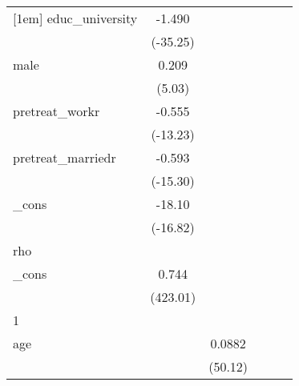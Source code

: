 {\begin{tabular}{l*{5}{c}}
[1em]
educ\_university&      -1.490\sym{***}&                     &                     &                     &                     \\
            &    (-35.25)         &                     &                     &                     &                     \\
[1em]
male        &       0.209\sym{***}&                     &                     &                     &                     \\
            &      (5.03)         &                     &                     &                     &                     \\
[1em]
pretreat\_workr&      -0.555\sym{***}&                     &                     &                     &                     \\
            &    (-13.23)         &                     &                     &                     &                     \\
[1em]
pretreat\_marriedr&      -0.593\sym{***}&                     &                     &                     &                     \\
            &    (-15.30)         &                     &                     &                     &                     \\
[1em]
\_cons      &      -18.10\sym{***}&                     &                     &                     &                     \\
            &    (-16.82)         &                     &                     &                     &                     \\
\hline
rho         &                     &                     &                     &                     &                     \\
\_cons      &       0.744\sym{***}&                     &                     &                     &                     \\
            &    (423.01)         &                     &                     &                     &                     \\
\hline
1           &                     &                     &                     &                     &                     \\
age         &                     &      0.0882\sym{***}&                     &                     &                     \\
            &                     &     (50.12)         &                     &                     &                     \\

\end{tabular}}
